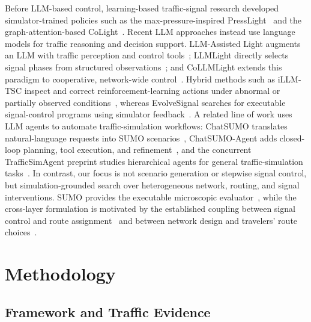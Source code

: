 \documentclass{trbunofficial}
\begin{document}
Before LLM-based control, learning-based traffic-signal research developed
simulator-trained policies such as the max-pressure-inspired
PressLight~\cite{wei2019presslight} and the graph-attention-based
CoLight~\cite{wei2019colight}. Recent LLM approaches instead use language models for
traffic reasoning and decision support. LLM-Assisted Light augments an LLM with
traffic perception and control tools~\cite{wang2024llmassistedlight}; LLMLight
directly selects signal phases from structured
observations~\cite{lai2025llmlight}; and CoLLMLight extends this paradigm to cooperative,
network-wide control~\cite{yuan2026collmlight}. Hybrid methods such as iLLM-TSC
inspect and correct reinforcement-learning actions under abnormal or partially
observed conditions~\cite{pang2024illmtsc}, whereas EvolveSignal searches for
executable signal-control programs using simulator
feedback~\cite{wang2025evolvesignal}. A related line of work uses LLM agents to automate
traffic-simulation workflows: ChatSUMO translates natural-language requests
into SUMO scenarios~\cite{li2024chatsumo}, ChatSUMO-Agent adds closed-loop
planning, tool execution, and refinement~\cite{li2026chatsumoagent}, and the
concurrent TrafficSimAgent preprint studies hierarchical agents for general
traffic-simulation tasks~\cite{du2025trafficsimagent}. In contrast, our focus is
not scenario generation or stepwise signal control, but simulation-grounded
search over heterogeneous network, routing, and signal interventions. SUMO
provides the executable microscopic evaluator~\cite{lopez2018sumo}, while the
cross-layer formulation is motivated by the established coupling between
signal control and route assignment~\cite{meneguzzer1997combined} and between
network design and travelers' route choices~\cite{yang1998networkdesign}.


\section{Methodology}
\label{sec:methodology}

\subsection{Framework and Traffic Evidence}
\label{sec:framework-evidence}
\end{document}
